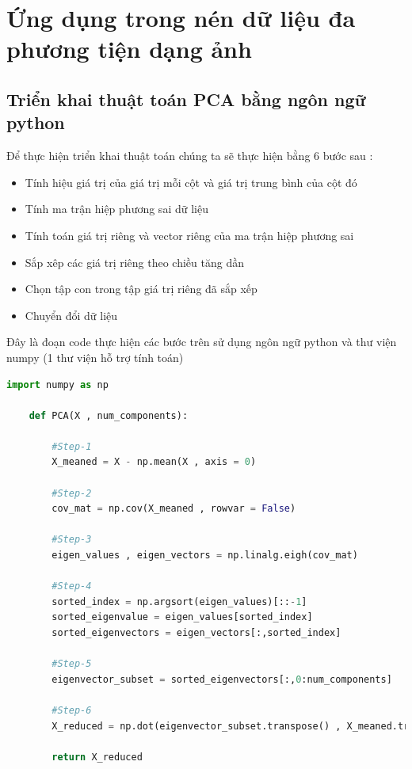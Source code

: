 \section{Ứng dụng trong nén dữ liệu đa phương tiện dạng ảnh}

\subsection{Triển khai thuật toán PCA bằng ngôn ngữ python}

Để thực hiện triển khai thuật toán chúng ta sẽ thực hiện bằng 6 bước sau :

\begin{itemize}
    \item Tính hiệu giá trị của giá trị mỗi cột và giá trị trung bình của cột đó
    \item Tính ma trận hiệp phương sai dữ liệu
    \item Tính toán giá trị riêng và vector riêng của ma trận hiệp phương sai
    \item Sắp xêp các giá trị riêng theo chiều tăng dần
    \item Chọn tập con trong tập giá trị riêng đã sắp xếp
    \item Chuyển đổi dữ liệu
\end{itemize}

\newpage
Đây là đoạn code thực hiện các bước trên sử dụng ngôn ngữ python và thư viện numpy (1 thư viện hỗ trợ tính toán)
\begin{lstlisting}[language=Python]
    import numpy as np
 
    def PCA(X , num_components):
        
        #Step-1
        X_meaned = X - np.mean(X , axis = 0)
        
        #Step-2
        cov_mat = np.cov(X_meaned , rowvar = False)
        
        #Step-3
        eigen_values , eigen_vectors = np.linalg.eigh(cov_mat)
        
        #Step-4
        sorted_index = np.argsort(eigen_values)[::-1]
        sorted_eigenvalue = eigen_values[sorted_index]
        sorted_eigenvectors = eigen_vectors[:,sorted_index]
        
        #Step-5
        eigenvector_subset = sorted_eigenvectors[:,0:num_components]
        
        #Step-6
        X_reduced = np.dot(eigenvector_subset.transpose() , X_meaned.transpose() ).transpose()
        
        return X_reduced
    
\end{lstlisting}

